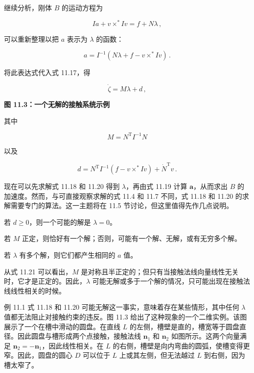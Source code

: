 \documentclass[10pt,a4paper]{book}
\theoremstyle{thmstyle} %
\theoremstyle{defstyle} %
\theoremstyle{prostyle} %
\begin{document}
继续分析，刚体 $B$ 的运动方程为



$$
I a + v \times ^{*} I v = f + N \lambda \, ,
$$



可以重新整理以把 $a$ 表示为 $\lambda$ 的函数：



$$
a = I ^{- 1} ( N \lambda + f - v \times ^{*} I v ) \, .
$$



将此表达式代入式 11.17，得



$$
\dot { \zeta } = M \lambda + d \, ,
$$



\noindent\textbf{图 11.3：一个无解的接触系统示例}





其中



$$
M = N ^{\mathrm { T} } I ^{- 1} N
$$



以及



$$
d = N ^{\mathrm { T} } I ^{- 1} ( f - v \times ^{*} I v ) + \dot { N } ^{\mathrm { T} } v \, .
$$



现在可以先求解式 11.18 和 11.20 得到 $\lambda$，再由式 11.19 计算 $\boldsymbol{a}$，从而求出 $B$ 的加速度。然而，与可直接观察求解的式 11.4 和 11.7 不同，式 11.18 和 11.20 的求解需要专门的算法。这一主题将在 11.5 节讨论，但这里值得先作几点说明。



若 $d \geq 0$，则一个可能的解是 $\lambda = 0$。



若 $M$ 正定，则恰好有一个解；否则，可能有一个解、无解，或有无穷多个解。



若 $\lambda$ 有多个解，则它们都产生相同的 $a$ 值。



从式 11.21 可以看出，$M$ 是对称且半正定的；但只有当接触法线向量线性无关时，它才是正定的。因此，$\lambda$ 可能无解或多于一个解的情况，只可能出现在接触法线线性相关的时候。



例 11.1 式 11.18 和 11.20 可能无解这一事实，意味着存在某些情形，其中任何 $\lambda$ 值都无法阻止对接触约束的违反。图 11.3 给出了这种现象的一个二维实例。该图展示了一个在槽中滑动的圆盘。在直线 $L$ 的左侧，槽壁是直的，槽宽等于圆盘直径。因此圆盘与槽形成两个点接触，接触法线 $\mathbf{n}_1$ 和 $\mathbf{n}_2$ 如图所示。这两个向量满足 $\mathbf{n}_2 = -\mathbf{n}_1$，因此线性相关。在 $L$ 的右侧，槽壁是向内弯曲的圆弧，使槽变得更窄。因此，圆盘的圆心 $D$ 可以位于 $L$ 上或其左侧，但无法越过 $L$ 到右侧，因为槽太窄了。
\end{document}
